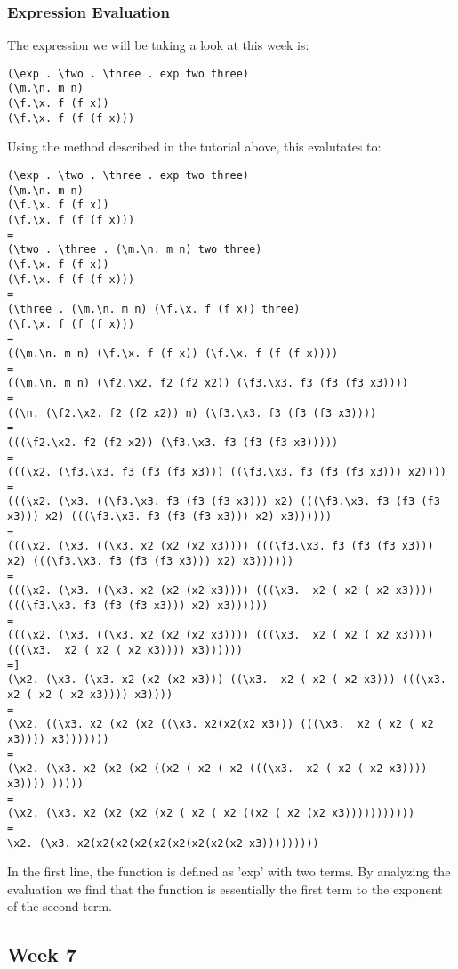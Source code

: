 \documentclass{article}
\theoremstyle{theorem}
\theoremstyle{definition}
\theoremstyle{remark}
\begin{document}
\subsubsection{Expression Evaluation}
The expression we will be taking a look at this week is:
\begin{lstlisting}
(\exp . \two . \three . exp two three)
(\m.\n. m n)
(\f.\x. f (f x))
(\f.\x. f (f (f x)))
\end{lstlisting}
Using the method described in the tutorial above, this evalutates to:
\begin{lstlisting}
(\exp . \two . \three . exp two three)
(\m.\n. m n)
(\f.\x. f (f x))
(\f.\x. f (f (f x)))
=
(\two . \three . (\m.\n. m n) two three)
(\f.\x. f (f x))
(\f.\x. f (f (f x)))
=
(\three . (\m.\n. m n) (\f.\x. f (f x)) three)
(\f.\x. f (f (f x)))
= 
((\m.\n. m n) (\f.\x. f (f x)) (\f.\x. f (f (f x))))
=
((\m.\n. m n) (\f2.\x2. f2 (f2 x2)) (\f3.\x3. f3 (f3 (f3 x3))))
=
((\n. (\f2.\x2. f2 (f2 x2)) n) (\f3.\x3. f3 (f3 (f3 x3))))
=
(((\f2.\x2. f2 (f2 x2)) (\f3.\x3. f3 (f3 (f3 x3)))))
=
(((\x2. (\f3.\x3. f3 (f3 (f3 x3))) ((\f3.\x3. f3 (f3 (f3 x3))) x2))))
=
(((\x2. (\x3. ((\f3.\x3. f3 (f3 (f3 x3))) x2) (((\f3.\x3. f3 (f3 (f3 x3))) x2) (((\f3.\x3. f3 (f3 (f3 x3))) x2) x3))))))
=
(((\x2. (\x3. ((\x3. x2 (x2 (x2 x3)))) (((\f3.\x3. f3 (f3 (f3 x3))) x2) (((\f3.\x3. f3 (f3 (f3 x3))) x2) x3))))))
=
(((\x2. (\x3. ((\x3. x2 (x2 (x2 x3)))) (((\x3.  x2 ( x2 ( x2 x3)))) (((\f3.\x3. f3 (f3 (f3 x3))) x2) x3))))))
=
(((\x2. (\x3. ((\x3. x2 (x2 (x2 x3)))) (((\x3.  x2 ( x2 ( x2 x3)))) (((\x3.  x2 ( x2 ( x2 x3)))) x3))))))
=]
(\x2. (\x3. (\x3. x2 (x2 (x2 x3))) ((\x3.  x2 ( x2 ( x2 x3))) (((\x3.  x2 ( x2 ( x2 x3)))) x3))))
=
(\x2. ((\x3. x2 (x2 (x2 ((\x3. x2(x2(x2 x3))) (((\x3.  x2 ( x2 ( x2 x3)))) x3)))))))
=
(\x2. (\x3. x2 (x2 (x2 ((x2 ( x2 ( x2 (((\x3.  x2 ( x2 ( x2 x3)))) x3)))) )))))
=
(\x2. (\x3. x2 (x2 (x2 (x2 ( x2 ( x2 ((x2 ( x2 (x2 x3)))))))))))
=
\x2. (\x3. x2(x2(x2(x2(x2(x2(x2(x2(x2 x3)))))))))
\end{lstlisting}
In the first line, the function is defined as 'exp' with two terms. By analyzing the evaluation we find that the function is essentially the first term to the exponent of the second term.

\subsection{Week 7}
\end{document}
